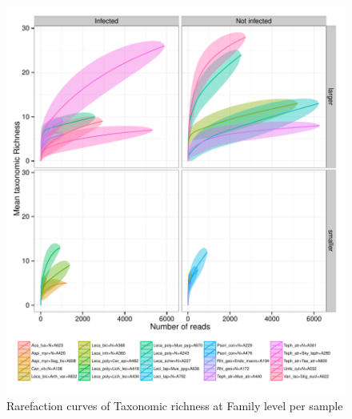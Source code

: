 \documentclass[a4paper, 11]{article}\usepackage[]{graphicx}\usepackage[]{color}
\makeatletter
\def\maxwidth{ %
  \ifdim\Gin@nat@width>\linewidth
    \linewidth
  \else
    \Gin@nat@width
  \fi
}
\newenvironment{knitrout}{}{} %
\makeatother
\begin{document}
\begin{knitrout}
\color{fgcolor}\begin{figure}[H]
\includegraphics[width=\maxwidth]{figure/rarefact_Families-1} \caption[Rarefaction curves of Taxonomic richness at Family level per sample]{Rarefaction curves of Taxonomic richness at Family level per sample}\label{fig:rarefact_Families}
\end{figure}


\end{knitrout}
\end{document}
